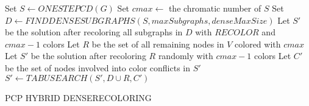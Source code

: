 \begin{algorithm}
Set $S \gets ONESTEPCD(G)$\;
Set $cmax \gets$ the chromatic number of $S$\;
Set $D \gets FINDDENSESUBGRAPHS( S, maxSubgraphs, denseMaxSize) $\;
Let $S'$ be the solution after recoloring all subgraphs in $D$ with $RECOLOR$ and $cmax-1$ colors\;
Let $R$ be the set of all remaining nodes in $V$ colored with $cmax$\;
Let $S'$ be the solution after recoloring $R$ randomly with $cmax-1$ colors\;
Let $C'$ be the set of nodes involved into color conflicts in $S'$\;
$S' \gets TABUSEARCH(S', D \cup R, C')$\;
\;
\caption{PCP HYBRID DENSERECOLORING}
\label{algo:proposal}
\end{algorithm}



